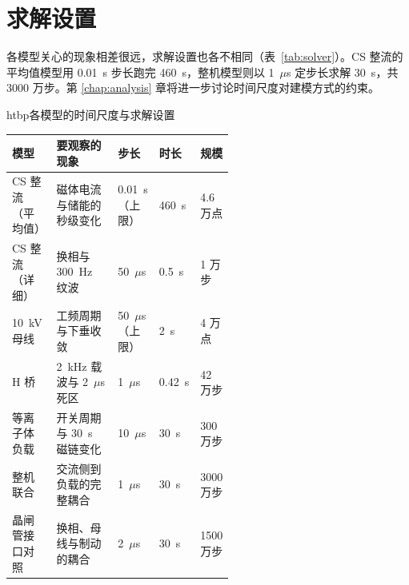 \section{求解设置}

各模型关心的现象相差很远，求解设置也各不相同（表~\ref{tab:solver}）。CS 整流的平均值模型用 0.01~s 步长跑完 460~s，整机模型则以 1~$\mu$s 定步长求解 30~s，共 3000 万步。第 \ref{chap:analysis} 章将进一步讨论时间尺度对建模方式的约束。

\begin{dtable}{htbp}{各模型的时间尺度与求解设置}
\label{tab:solver}
\begin{tabularx}{\linewidth}{P{0.2\linewidth}LP{0.15\linewidth}P{0.08\linewidth}P{0.12\linewidth}}
\toprule
\headrow 模型 & 要观察的现象 & 步长 & 时长 & 规模 \\
\midrule
CS 整流（平均值） & 磁体电流与储能的秒级变化 & 0.01~s（上限） & 460~s & 4.6 万点 \\
CS 整流（详细） & 换相与 300~Hz 纹波 & 50~$\mu$s & 0.5~s & 1 万步 \\
10~kV 母线 & 工频周期与下垂收敛 & 50~$\mu$s（上限） & 2~s & 4 万点 \\
H 桥 & 2~kHz 载波与 2~$\mu$s 死区 & 1~$\mu$s & 0.42~s & 42 万步 \\
等离子体负载 & 开关周期与 30~s 磁链变化 & 10~$\mu$s & 30~s & 300 万步 \\
整机联合 & 交流侧到负载的完整耦合 & 1~$\mu$s & 30~s & 3000 万步 \\
晶闸管接口对照 & 换相、母线与制动的耦合 & 2~$\mu$s & 30~s & 1500 万步 \\
\bottomrule
\end{tabularx}
\end{dtable}
